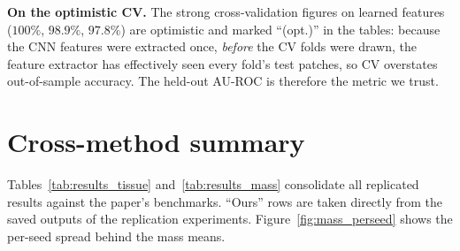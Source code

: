 \textbf{On the optimistic CV.} The strong cross-validation figures on learned features ($100\%$, $98.9\%$, $97.8\%$) are optimistic and marked ``(opt.)'' in the tables: because the CNN features were extracted once, \emph{before} the CV folds were drawn, the feature extractor has effectively seen every fold's test patches, so CV overstates out-of-sample accuracy. The held-out AU-ROC is therefore the metric we trust.

\section{Cross-method summary} \label{sec:summary_results}

Tables~\ref{tab:results_tissue} and~\ref{tab:results_mass} consolidate all replicated results against the paper's benchmarks. ``Ours'' rows are taken directly from the saved outputs of the replication experiments. Figure~\ref{fig:mass_perseed} shows the per-seed spread behind the mass means.

